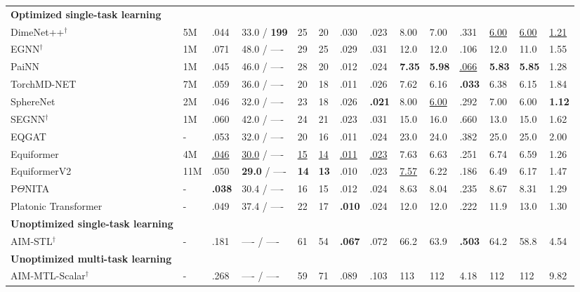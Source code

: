 \documentclass{article}
\theoremstyle{plain}
\theoremstyle{definition}
\theoremstyle{remark}
\begin{document}
\begin{table}[!ht]
{\begin{tabular}{llllllllllllll}
\midrule
\textbf{Optimized single-task learning} \\
DimeNet++$^\dagger$        & 5M & .044 & 33.0 / \textbf{199} & 25 & 20 & .030 & .023 & 8.00    & 7.00    & .331 & \underline{6.00}   & \underline{6.00}   & \underline{1.21} \\
EGNN$^\dagger$    & 1M & .071 & 48.0 / ---- & 29 & 25 & .029 & .031 & 12.0   & 12.0   & .106 & 12.0  & 11.0  & 1.55 \\
PaiNN               & 1M & .045 & 46.0 / ---- & 28 & 20 & .012 & .024 & \textbf{7.35} & \textbf{5.98} & \underline{.066} & \textbf{5.83} & \textbf{5.85} & 1.28 \\
TorchMD-NET   & 7M & .059 & 36.0 / ---- & 20 & 18 & .011 & .026 & 7.62 & 6.16 & \textbf{.033} & 6.38 & 6.15 & 1.84 \\
SphereNet              & 2M & .046 & 32.0 / ---- & 23 & 18 & .026 & \textbf{.021} & 8.00    & \underline{6.00}    & .292 & 7.00   & 6.00   & \textbf{1.12} \\
SEGNN$^\dagger$ & 1M & .060 & 42.0 / ---- & 24 & 21 & .023 & .031 & 15.0   & 16.0   & .660 & 13.0  & 15.0  & 1.62 \\
EQGAT                   & - & .053 & 32.0 / ---- & 20 & 16 & .011 & .024 & 23.0   & 24.0   & .382 & 25.0  & 25.0  & 2.00 \\
Equiformer          & 4M & \underline{.046} & \underline{30.0} / ---- & \underline{15} & \underline{14} & \underline{.011} & \underline{.023} & 7.63 & 6.63 & .251 & 6.74 & 6.59 & 1.26 \\
EquiformerV2          & 11M & .050 & \textbf{29.0} / ---- & \textbf{14} & \textbf{13} & .010 & .023 & \underline{7.57} & 6.22 & .186 & 6.49 & 6.17 & 1.47 \\
P$\Theta$NITA   & - & \textbf{.038} & 30.4 / ---- & 16 & 15 & .012 & .024 & 8.63 & 8.04 & .235 & 8.67 & 8.31 & 1.29 \\
Platonic Transformer         & - & .049 & 37.4 / ---- & 22 & 17 & \textbf{.010} & .024 & 12.0 & 12.0 & .222 & 11.9 & 13.0 & 1.30 \\
\midrule
\textbf{Unoptimized single-task learning} \\
AIM-STL$^\dagger$         & - & .181 & ---- / ---- & 61 & 54 & \textbf{.067} & .072 & 66.2 & 63.9 & \textbf{.503} & 64.2 & 58.8 & 4.54 \\
\textbf{Unoptimized multi-task learning} \\
AIM-MTL-Scalar$^\dagger$         & - & .268 & ---- / ---- & 59 & 71 & .089 & .103 & 113 & 112 & 4.18 & 112 & 112 & 9.82 \\

\end{tabular}}
\end{table}
\end{document}
